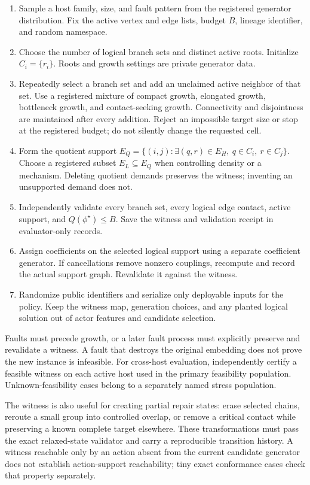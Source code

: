 \begin{enumerate}
 \item Sample a host family, size, and fault pattern from the registered generator distribution. Fix the active vertex and edge lists, budget $B$, lineage identifier, and random namespace.
 \item Choose the number of logical branch sets and distinct active roots. Initialize $C_i=\{r_i\}$. Roots and growth settings are private generator data.
 \item Repeatedly select a branch set and add an unclaimed active neighbor of that set. Use a registered mixture of compact growth, elongated growth, bottleneck growth, and contact-seeking growth. Connectivity and disjointness are maintained after every addition. Reject an impossible target size or stop at the registered budget; do not silently change the requested cell.
 \item Form the quotient support $E_Q=\{(i,j):\exists(q,r)\in E_H,\ q\in C_i,\ r\in C_j\}$. Choose a registered subset $E_L\subseteq E_Q$ when controlling density or a mechanism. Deleting quotient demands preserves the witness; inventing an unsupported demand does not.
 \item Independently validate every branch set, every logical edge contact, active support, and $Q(\phi^\star)\le B$. Save the witness and validation receipt in evaluator-only records.
 \item Assign coefficients on the selected logical support using a separate coefficient generator. If cancellations remove nonzero couplings, recompute and record the actual support graph. Revalidate it against the witness.
 \item Randomize public identifiers and serialize only deployable inputs for the policy. Keep the witness map, generation choices, and any planted logical solution out of actor features and candidate selection.
\end{enumerate}

Faults must precede growth, or a later fault process must explicitly preserve and revalidate a witness. A fault that destroys the original embedding does not prove the new instance is infeasible. For cross-host evaluation, independently certify a feasible witness on each active host used in the primary feasibility population. Unknown-feasibility cases belong to a separately named stress population.

The witness is also useful for creating partial repair states: erase selected chains, reroute a small group into controlled overlap, or remove a critical contact while preserving a known complete target elsewhere. These transformations must pass the exact relaxed-state validator and carry a reproducible transition history. A witness reachable only by an action absent from the current candidate generator does not establish action-support reachability; tiny exact conformance cases check that property separately.

